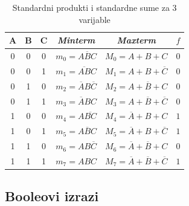 \documentclass[times, utf8, diplomski]{fer}
\begin{document}
\begin{table}[htb]
	\centering
	\caption{Standardni produkti i standardne sume za $3$ varijable}
	\label{tab:minterms}
	\setlength{\tabcolsep}{12pt}
	\begin{tabular}{|ccc|c|c|c|}
		\hline
		A & B & C & \textit{Minterm} 					& \textit{Maxterm} 									& $f$ \\
		\hline
		0 & 0 & 0 & $m_{0}=\overline{ABC}$ 				& $M_{0}=A+B+C$ 									& $0$ \\
		0 & 0 & 1 & $m_{1}=\overline{AB}C$ 				& $M_{1}=A+B+\overline{C}$ 							& $0$ \\
		0 & 1 & 0 & $m_{2}=\overline{A}B\overline{C}$ 	& $M_{2}=A+\overline{B}+C$ 							& $0$ \\
		0 & 1 & 1 & $m_{3}=\overline{A}BC$ 				& $M_{3}=A+\overline{B}+\overline{C}$ 				& $0$ \\
		1 & 0 & 0 & $m_{4}=A\overline{BC}$ 				& $M_{4}=\overline{A}+B+C$ 							& $1$ \\
		1 & 0 & 1 & $m_{5}=A\overline{B}C$ 				& $M_{5}=\overline{A}+B+\overline{C}$ 				& $1$ \\
		1 & 1 & 0 & $m_{6}=AB\overline{C}$ 				& $M_{6}=\overline{A}+\overline{B}+C$ 				& $0$ \\
		1 & 1 & 1 & $m_{7}=ABC$ 						& $M_{7}=\overline{A}+\overline{B}+\overline{C}$ 	& $1$ \\
		\hline
	\end{tabular}
\end{table}

\subsection{Booleovi izrazi}
\end{document}
